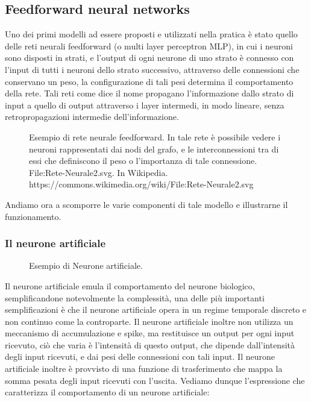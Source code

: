 \subsection{Feedforward neural networks}

Uno dei primi modelli ad essere proposti e utilizzati nella pratica è stato quello delle reti neurali feedforward (o multi layer perceptron MLP),
in cui i neuroni sono disposti in strati, e l'output di ogni neurone di uno strato è connesso con l'input di tutti i neuroni dello strato successivo, 
attraverso delle connessioni che conservano un peso, la configurazione di tali pesi determina il comportamento della rete.
Tali reti come dice il nome propagano l'informazione dallo strato di input a quello di output attraverso i layer intermedi,
in modo lineare, senza retropropagazioni intermedie dell'informazione.

    \begin{figure}[H]
        \centering
        
        \caption{Esempio di rete neurale feedforward. In tale rete è possibile vedere i neuroni rappresentati dai nodi del grafo, e
        le interconnessioni tra di essi che definiscono il peso o l'importanza di tale connessione.\\
        File:Rete-Neurale2.svg. In Wikipedia. https://commons.wikimedia.org/wiki/File:Rete-Neurale2.svg}
        \label{fig:feedforward_nn}
    \end{figure}

Andiamo ora a scomporre le varie componenti di tale modello e illustrarne il funzionamento.

\subsubsection{Il neurone artificiale}

    \begin{figure}
        \centering
        \vspace{-25pt}
        
        \caption{Esempio di Neurone artificiale.}
        \label{fig:artificial_neuron}
        \vspace{0pt}
    \end{figure}

Il neurone artificiale emula il comportamento del neurone biologico, semplificandone notevolmente la complessità,
una delle più importanti semplificazioni è che il neurone artificiale opera in un regime temporale discreto e non continuo come la controparte.
Il neurone artificiale inoltre non utilizza un meccanismo di accumulazione e spike, ma restituisce un output per ogni input ricevuto,
ciò che varia è l'intensità di questo output, che dipende dall'intensità degli input ricevuti, e dai pesi delle connessioni con tali input.
Il neurone artificiale inoltre è provvisto di una funzione di trasferimento che mappa la somma pesata degli input ricevuti con l'uscita.
Vediamo dunque l'espressione che caratterizza il comportamento di un neurone artificiale:

